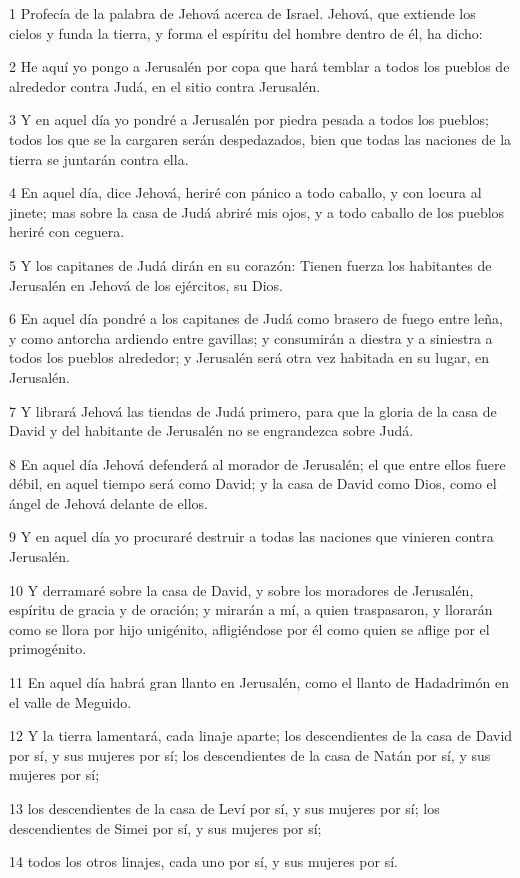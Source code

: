 \par 1 Profecía de la palabra de Jehová acerca de Israel. Jehová, que extiende los cielos y funda la tierra, y forma el espíritu del hombre dentro de él, ha dicho:
\par 2 He aquí yo pongo a Jerusalén por copa que hará temblar a todos los pueblos de alrededor contra Judá, en el sitio contra Jerusalén.
\par 3 Y en aquel día yo pondré a Jerusalén por piedra pesada a todos los pueblos; todos los que se la cargaren serán despedazados, bien que todas las naciones de la tierra se juntarán contra ella.
\par 4 En aquel día, dice Jehová, heriré con pánico a todo caballo, y con locura al jinete; mas sobre la casa de Judá abriré mis ojos, y a todo caballo de los pueblos heriré con ceguera.
\par 5 Y los capitanes de Judá dirán en su corazón: Tienen fuerza los habitantes de Jerusalén en Jehová de los ejércitos, su Dios.
\par 6 En aquel día pondré a los capitanes de Judá como brasero de fuego entre leña, y como antorcha ardiendo entre gavillas; y consumirán a diestra y a siniestra a todos los pueblos alrededor; y Jerusalén será otra vez habitada en su lugar, en Jerusalén.
\par 7 Y librará Jehová las tiendas de Judá primero, para que la gloria de la casa de David y del habitante de Jerusalén no se engrandezca sobre Judá.
\par 8 En aquel día Jehová defenderá al morador de Jerusalén; el que entre ellos fuere débil, en aquel tiempo será como David; y la casa de David como Dios, como el ángel de Jehová delante de ellos.
\par 9 Y en aquel día yo procuraré destruir a todas las naciones que vinieren contra Jerusalén.
\par 10 Y derramaré sobre la casa de David, y sobre los moradores de Jerusalén, espíritu de gracia y de oración; y mirarán a mí, a quien traspasaron, y llorarán como se llora por hijo unigénito, afligiéndose por él como quien se aflige por el primogénito.
\par 11 En aquel día habrá gran llanto en Jerusalén, como el llanto de Hadadrimón en el valle de Meguido.
\par 12 Y la tierra lamentará, cada linaje aparte; los descendientes de la casa de David por sí, y sus mujeres por sí; los descendientes de la casa de Natán por sí, y sus mujeres por sí;
\par 13 los descendientes de la casa de Leví por sí, y sus mujeres por sí; los descendientes de Simei por sí, y sus mujeres por sí;
\par 14 todos los otros linajes, cada uno por sí, y sus mujeres por sí.

